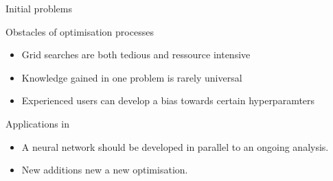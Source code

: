 \begin{frame}{Initial problems}
    \begin{block}{Obstacles of optimisation processes}
        \begin{itemize}
            \item Grid searches are both tedious and ressource intensive
            \item Knowledge gained in one problem is rarely universal
            \item Experienced users can develop a bias towards certain hyperparamters
        \end{itemize}
    \end{block}
    \begin{block}{Applications in}
        \begin{itemize}
            \item A neural network should be developed in parallel to an ongoing analysis.
            \item New additions new a new optimisation.
        \end{itemize}
    \end{block}
\end{frame}



